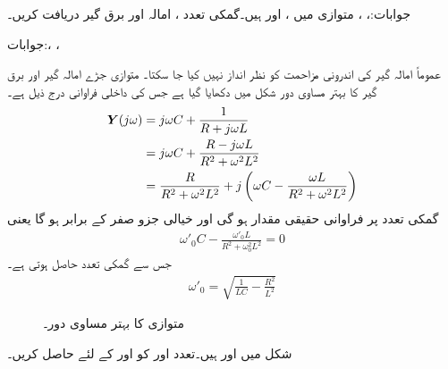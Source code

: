 جوابات:، ، 
متوازی  میں ،  اور  ہیں۔گمکی تعدد ، امالہ اور برق گیر دریافت کریں۔

جوابات:، ، 

عموماً امالہ گیر کی اندرونی مزاحمت کو نظر انداز نہیں کیا جا سکتا۔ متوازی جڑے امالہ گیر اور برق گیر کا بہتر مساوی دور شکل  میں دکھایا گیا ہے جس کی داخلی فراوانی درج ذیل ہے۔
\begin{align*}
{\ensuremath{{\boldsymbol{Y}}}}(j\omega)&=j\omega C+\frac{1}{R+j\omega L}\\
&=j\omega C+\frac{R-j\omega L}{R^2+\omega^2 L^2}\\
&=\frac{R}{R^2+\omega^2 L^2}+j\left(\omega C-\frac{\omega L}{R^2+\omega^2 L^2}\right)
\end{align*}
گمکی تعدد  پر فراوانی حقیقی مقدار ہو گی اور خیالی جزو صفر کے برابر ہو گا یعنی
\begin{align}
\omega'_0 C-\frac{\omega'_0 L}{R^2+\omega_0^2 L^2}=0
\end{align}
جس سے گمکی تعدد حاصل ہوتی ہے۔
\begin{align}
\omega'_0=\sqrt{\frac{1}{LC}-\frac{R^2}{L^2}}
\end{align}
%
\begin{figure}
\centering
{}
\caption{متوازی  کا بہتر مساوی دور۔}
\label{شکل_تعددی_بہتر_متوازی_دور}
\end{figure}
شکل  میں  اور  ہیں۔تعدد  اور  کو  اور  کے لئے حاصل کریں۔

